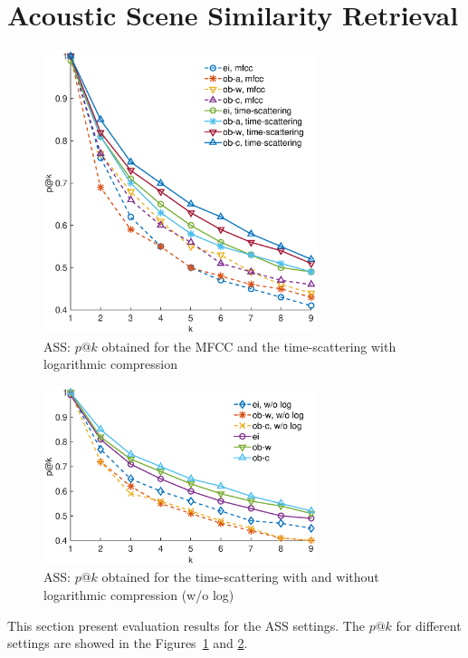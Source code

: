 \documentclass[journal]{IEEEtran}
\begin{document}
\section{Acoustic Scene Similarity Retrieval}

\begin{figure}
\begin{center}
\includegraphics[width=8cm]{gfx/unsupervised_test3.eps}
\caption{ASS: $p@k$ obtained for the MFCC and the time-scattering with logarithmic compression}
\label{fig:ASS_1}
\end{center}
\end{figure}

\begin{figure}
\begin{center}
\includegraphics[width=8cm]{gfx/unsupervised_test2.eps}
\caption{ASS: $p@k$ obtained for the time-scattering with and without logarithmic compression (w/o log)}
\label{fig:ASS_2}
\end{center}
\end{figure}

This section present evaluation results for the ASS settings. The $p@k$ for different settings are showed in the Figures~\ref{fig:ASS_1} and \ref{fig:ASS_2}.
\end{document}
